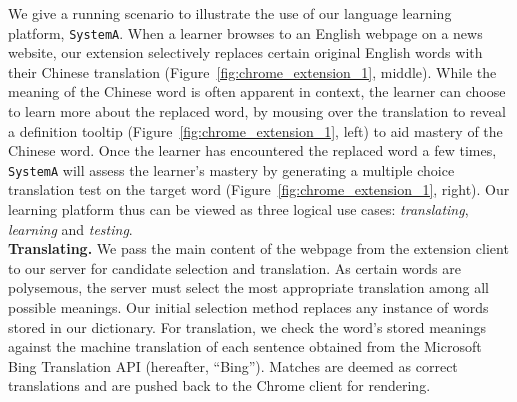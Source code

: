 \begin{CJK}{UTF8}{gbsn}
We give a running scenario to illustrate the use of our language
learning platform, {\tt SystemA}.  When a learner browses to an
English webpage on a news website, our extension selectively replaces
certain original English words with their Chinese translation
(Figure~\ref{fig:chrome_extension_1}, middle).  While the meaning of
the Chinese word is often apparent in context, the learner can choose
to learn more about the replaced word, by mousing over the translation
to reveal a definition tooltip (Figure~\ref{fig:chrome_extension_1},
left) to aid mastery of the Chinese word.  Once the learner has
encountered the replaced word a few times, {\tt SystemA} will assess
the learner's mastery by generating a multiple choice translation test
on the target word (Figure~\ref{fig:chrome_extension_1}, right). Our
learning platform thus can be viewed as three logical use cases:
{\it translating}, {\it learning} and {\it testing}. \\

{\bf Translating.}  We pass the main content of the webpage from the
extension client to our server for candidate selection and
translation.  As certain words are polysemous, the server must select
the most appropriate translation among all possible meanings. Our
initial selection method replaces any instance of words stored in our
dictionary. For translation, we check the word's stored meanings
against the machine translation of each sentence obtained from the
Microsoft Bing Translation API (hereafter, ``Bing'').  Matches are
deemed as correct translations and are pushed back to the Chrome
client for rendering.



\end{CJK}
